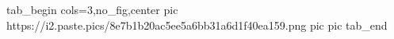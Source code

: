  
 
 
 
 
\zzSecCmtScr

\ifcmt
  tab_begin cols=3,no_fig,center
     pic https://i2.paste.pics/8e7b1b20ac5ee5a6bb31a6d1f40ea159.png
     pic 
     pic 
  tab_end
\fi
